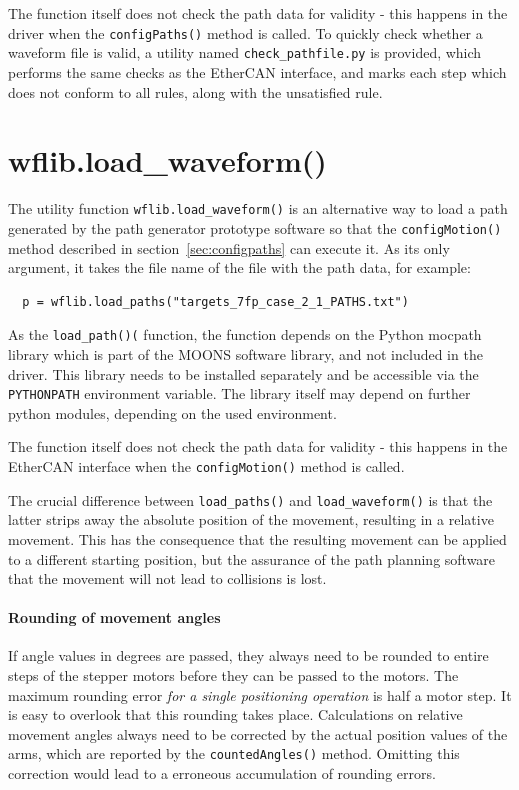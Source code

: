 \documentclass[fontsize=12,a4paper]{scrreprt}
\begin{document}
The function itself does not check the path data for validity - this
happens in the driver when the \texttt{configPaths()} method is
called. To quickly check whether a waveform file is valid, a utility
named \texttt{check\_pathfile.py} is provided, which performs the same
checks as the EtherCAN interface, and marks each step which does not conform to
all rules, along with the unsatisfied rule.


\section{wflib.load\_waveform()}
%
%
%
The utility function \texttt{wflib.load\_waveform()} is an alternative
way to load a path generated by the path generator prototype software
so that the \texttt{configMotion()} method described in
section~\ref{sec:configpaths} can execute it. As its only argument, it
takes the file name of the file with the path data, for example:

\begin{verbatim}
  p = wflib.load_paths("targets_7fp_case_2_1_PATHS.txt")
\end{verbatim}

As the \texttt{load\_path()(} function, the function depends on the
Python mocpath library which is part of the MOONS software library,
and not included in the driver.  This library needs to be installed
separately and be accessible via the \texttt{PYTHONPATH} environment
variable. The library itself may depend on further python modules,
depending on the used environment.

The function itself does not check the path data for validity - this
happens in the EtherCAN interface when the \texttt{configMotion()} method is
called.

The crucial difference between \texttt{load\_paths()} and
\texttt{load\_waveform()} is that the latter strips away the absolute
position of the movement, resulting in a relative movement.  This has
the consequence that the resulting movement can be applied to a
different starting position, but the assurance of the path planning
software that the movement will not lead to collisions is lost.


\paragraph{Rounding of movement angles}
%
%
If angle values in degrees are passed, they always need to be rounded
to entire steps of the stepper motors before they can be passed to the
motors.  The maximum rounding error \emph{for a single positioning
  operation} is half a motor step.  It is easy to overlook that this
rounding takes place.  Calculations on relative movement angles always
need to be corrected by the actual position values of the arms, which
are reported by the \texttt{countedAngles()} method. Omitting this
correction would lead to a erroneous accumulation of rounding errors.
\end{document}
